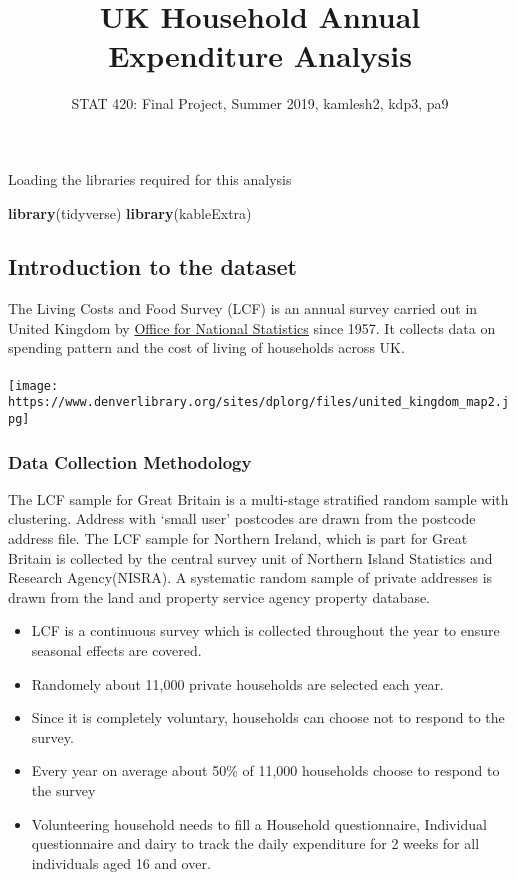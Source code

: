 \documentclass[]{article}
\title{UK Household Annual Expenditure Analysis}
\author{STAT 420: Final Project, Summer 2019, kamlesh2, kdp3, pa9}
\date{}
\newenvironment{Shaded}{\begin{snugshade}}{\end{snugshade}}
\newcommand{\KeywordTok}[1]{\textcolor[rgb]{0.13,0.29,0.53}{\textbf{#1}}}
\newcommand{\NormalTok}[1]{#1}
\begin{document}
\maketitle

Loading the libraries required for this analysis

\begin{Shaded}
\begin{Highlighting}[]
\KeywordTok{library}\NormalTok{(tidyverse)}
\KeywordTok{library}\NormalTok{(kableExtra)}
\end{Highlighting}
\end{Shaded}

\hypertarget{introduction-to-the-dataset}{%
\subsection{Introduction to the
dataset}\label{introduction-to-the-dataset}}

The Living Costs and Food Survey (LCF) is an annual survey carried out
in United Kingdom by \href{https://www.ons.gov.uk/}{Office for National
Statistics} since 1957. It collects data on spending pattern and the
cost of living of households across UK.\\
~\\

\texttt{[image: https://www.denverlibrary.org/sites/dplorg/files/united\_kingdom\_map2.jpg]}

\hypertarget{data-collection-methodology}{%
\subsubsection{Data Collection
Methodology}\label{data-collection-methodology}}

The LCF sample for Great Britain is a multi-stage stratified random
sample with clustering. Address with `small user' postcodes are drawn
from the postcode address file. The LCF sample for Northern Ireland,
which is part for Great Britain is collected by the central survey unit
of Northern Island Statistics and Research Agency(NISRA). A systematic
random sample of private addresses is drawn from the land and property
service agency property database.

\begin{itemize}
\item
  LCF is a continuous survey which is collected throughout the year to
  ensure seasonal effects are covered.
\item
  Randomely about 11,000 private households are selected each year.
\item
  Since it is completely voluntary, households can choose not to respond
  to the survey.
\item
  Every year on average about 50\% of 11,000 households choose to
  respond to the survey
\item
  Volunteering household needs to fill a Household questionnaire,
  Individual questionnaire and dairy to track the daily expenditure for
  2 weeks for all individuals aged 16 and over.
\end{itemize}
\end{document}
